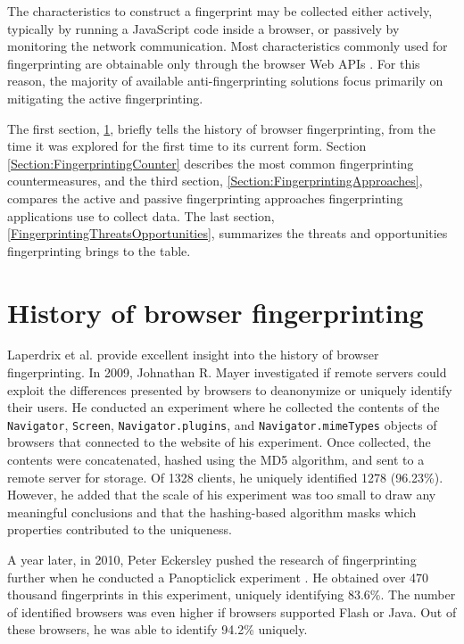 The characteristics to construct a fingerprint may be collected either actively, typically by running a JavaScript code inside a browser, or passively by monitoring the network communication. Most characteristics commonly used for fingerprinting are obtainable only through the browser Web APIs \cite{VondracekDP}. For this reason, the majority of available anti-fingerprinting solutions focus primarily on mitigating the active fingerprinting.

The first section, \ref{Section:FingerprintingHistory}, briefly tells the history of browser fingerprinting, from the time it was explored for the first time to its current form. Section \ref{Section:FingerprintingCounter} describes the most common fingerprinting countermeasures, and the third section, \ref{Section:FingerprintingApproaches}, compares the active and passive fingerprinting approaches fingerprinting applications use to collect data. The last section, \ref{FingerprintingThreatsOpportunities}, summarizes the threats and opportunities fingerprinting brings to the table.

\section{History of browser fingerprinting}
\label{Section:FingerprintingHistory}

Laperdrix et al. \cite{FingerprintingSurvey} provide excellent insight into the history of browser fingerprinting. In 2009, Johnathan R. Mayer investigated \cite{MayerAnyPerson} if remote servers could exploit the differences presented by browsers to deanonymize or uniquely identify their users. He conducted an experiment where he collected the contents of the \texttt{Navigator}, \texttt{Screen}, \texttt{Navigator.plugins}, and \texttt{Navigator.mimeTypes} objects of browsers that connected to the website of his experiment. Once collected, the contents were concatenated, hashed using the MD5 algorithm, and sent to a remote server for storage. Of 1328 clients, he uniquely identified 1278 (96.23\%). However, he added that the scale of his experiment was too small to draw any meaningful conclusions and that the hashing-based algorithm masks which properties contributed to the uniqueness.

A year later, in 2010, Peter Eckersley pushed the research of fingerprinting further when he conducted a Panopticlick experiment \cite{EckersleyHowUnique}. He obtained over 470 thousand fingerprints in this experiment, uniquely identifying 83.6\%. The number of identified browsers was even higher if browsers supported Flash or Java. Out of these browsers, he was able to identify 94.2\% uniquely.

